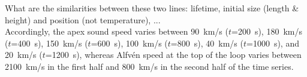 \documentclass{aa}
\begin{document}
{{\color{red}What are the similarities between these two lines: lifetime, initial size (length \& height) and position (not temperature), ... }\\
{\color{red}Accordingly, the apex sound speed varies between 90~km/s ($t$=200~s), 180~km/s ($t$=400~s), 150~km/s ($t$=600~s), 100~km/s ($t$=800~s), 40~km/s ($t$=1000~s), and 20~km/s ($t$=1200~s), whereas Alfv\'en speed at the top of the loop varies between 2100~km/s in the first half and 800~km/s in the second half of the time series.}



}
\end{document}
